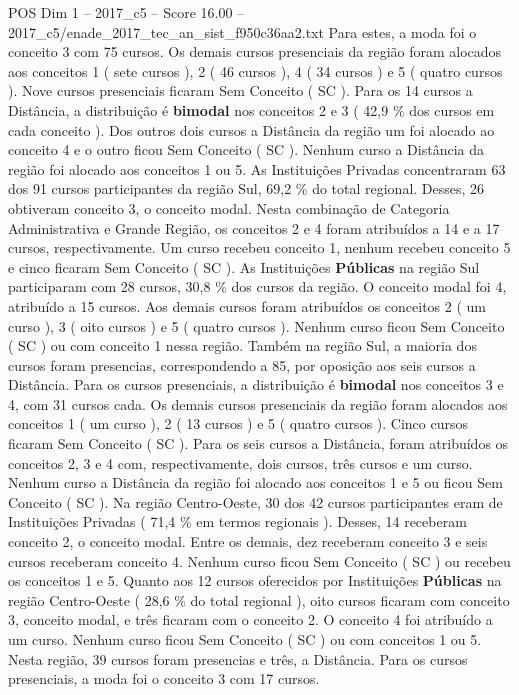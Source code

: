 \begin{textsample}{POS Dim 1 – 2017\_c5 – Score 16.00 – 2017\_c5/enade\_2017\_tec\_an\_sist\_f950c36aa2.txt}
Para estes, a moda foi o conceito 3 com 75 cursos.
Os demais cursos presenciais da região foram alocados aos conceitos 1 ( sete cursos ), 2 ( 46 cursos ), 4 ( 34 cursos ) e 5 ( quatro cursos ).
Nove cursos presenciais ficaram Sem Conceito ( SC ).
Para os 14 cursos a Distância, a distribuição é \textbf{bimodal} nos conceitos 2 e 3 ( 42,9 \% dos cursos em cada conceito ).
Dos outros dois cursos a Distância da região um foi alocado ao conceito 4 e o outro ficou Sem Conceito ( SC ).
Nenhum curso a Distância da região foi alocado aos conceitos 1 ou 5.
As Instituições Privadas concentraram 63 dos 91 cursos participantes da região Sul, 69,2 \% do total regional.
Desses, 26 obtiveram conceito 3, o conceito modal.
Nesta combinação de Categoria Administrativa e Grande Região, os conceitos 2 e 4 foram atribuídos a 14 e a 17 cursos, respectivamente.
Um curso recebeu conceito 1, nenhum recebeu conceito 5 e cinco ficaram Sem Conceito ( SC ).
As Instituições \textbf{Públicas} na região Sul participaram com 28 cursos, 30,8 \% dos cursos da região.
O conceito modal foi 4, atribuído a 15 cursos.
Aos demais cursos foram atribuídos os conceitos 2 ( um curso ), 3 ( oito cursos ) e 5 ( quatro cursos ).
Nenhum curso ficou Sem Conceito ( SC ) ou com conceito 1 nessa região.
Também na região Sul, a maioria dos cursos foram presencias, correspondendo a 85, por oposição aos seis cursos a Distância.
Para os cursos presenciais, a distribuição é \textbf{bimodal} nos conceitos 3 e 4, com 31 cursos cada.
Os demais cursos presenciais da região foram alocados aos conceitos 1 ( um curso ), 2 ( 13 cursos ) e 5 ( quatro cursos ).
Cinco cursos ficaram Sem Conceito ( SC ).
Para os seis cursos a Distância, foram atribuídos os conceitos 2, 3 e 4 com, respectivamente, dois cursos, três cursos e um curso.
Nenhum curso a Distância da região foi alocado aos conceitos 1 e 5 ou ficou Sem Conceito ( SC ).
Na região Centro-Oeste, 30 dos 42 cursos participantes eram de Instituições Privadas ( 71,4 \% em termos regionais ).
Desses, 14 receberam conceito 2, o conceito modal.
Entre os demais, dez receberam conceito 3 e seis cursos receberam conceito 4.
Nenhum curso ficou Sem Conceito ( SC ) ou recebeu os conceitos 1 e 5.
Quanto aos 12 cursos oferecidos por Instituições \textbf{Públicas} na região Centro-Oeste ( 28,6 \% do total regional ), oito cursos ficaram com conceito 3, conceito modal, e três ficaram com o conceito 2.
O conceito 4 foi atribuído a um curso.
Nenhum curso ficou Sem Conceito ( SC ) ou com conceitos 1 ou 5.
Nesta região, 39 cursos foram presencias e três, a Distância.
Para os cursos presenciais, a moda foi o conceito 3 com 17 cursos.

\end{textsample}
